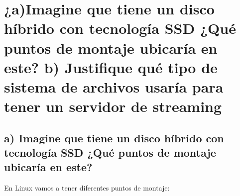 	
	\section{¿a)Imagine que tiene un disco híbrido con tecnología SSD ¿Qué puntos de montaje ubicaría en este? b) Justifique qué tipo de sistema de archivos usaría para tener un servidor de streaming}
	
	\subsection{a) Imagine que tiene un disco híbrido con tecnología SSD ¿Qué puntos de montaje ubicaría en este?}
	
	En Linux vamos a tener diferentes puntos de montaje\cite{veintiocho,veintinueve}:
	
